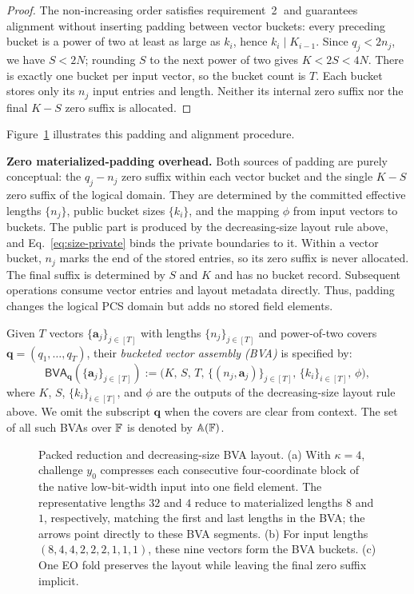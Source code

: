 \begin{proof}
The non-increasing order satisfies requirement~\textcircled{2} and guarantees
alignment without inserting padding between vector buckets: every preceding
bucket is a power of two at least as large as $k_i$, hence
$k_i\mid K_{i-1}$.  Since $q_j<2n_j$, we have $S<2N$;
rounding $S$ to the next power of two gives $K<2S<4N$.
There is exactly one bucket per input vector, so the bucket count is $T$.  Each bucket stores
only its $n_j$ input entries and length.  Neither its internal zero suffix nor
the final $K-S$ zero suffix is allocated.
\end{proof}
Figure~\ref{fig:layout} illustrates this padding and alignment procedure.

\mysmallskip
\noindent
\textbf{Zero materialized-padding overhead.}
Both sources of padding are purely conceptual: the $q_j-n_j$ zero suffix within
each vector bucket and the single $K-S$ zero suffix of the logical domain.
They are determined by the committed effective lengths $\{n_j\}$, public bucket
sizes $\{k_i\}$, and the mapping $\phi$ from input vectors to buckets.  The
public part is produced by the decreasing-size layout rule above, and
Eq.~\eqref{eq:size-private} binds the private boundaries to it.
Within a vector bucket, $n_j$ marks the end of the stored entries, so its zero
suffix is never allocated.  The final suffix is determined by $S$ and $K$ and
has no bucket record.  Subsequent operations consume vector entries and layout
metadata directly.  Thus, padding changes the logical PCS domain but adds no
stored field elements.

\begin{definition}
    Given $T$ vectors $\{\bm{a}_j\}_{j\in[T]}$ with lengths $\{n_j\}_{j\in[T]}$
and power-of-two covers $\bm q=(q_1,\ldots,q_T)$,
their \emph{bucketed vector assembly (BVA)} is specified by:
\[
    \mathsf{BVA}_{\bm q}(\{\bm{a}_j\}_{j\in[T]})
    :=
    \big(
        K,\,
        S,\,
        T,\,
        \{(n_j,\bm{a}_j)\}_{j\in[T]},\,
        \{k_i\}_{i\in[T]},\,
        \phi
    \big),
\]
where $K$, $S$, $\{k_i\}_{i\in[T]}$, and $\phi$ are the outputs of
the decreasing-size layout rule above.  We omit the subscript $\bm q$ when the covers are
clear from context.
The set of all such BVAs over ${\mathbb{F}}$ is denoted by ${\mathbb{A}({\mathbb{F}})}$.
\end{definition}

\begin{figure}[!t]
\noindent
\resizebox{\linewidth}{!}{

}
\caption{Packed reduction and decreasing-size BVA layout.  (a) With
$\kappa=4$, challenge $y_0$ compresses each consecutive four-coordinate block
of the native low-bit-width input into one field element.  The representative
lengths $32$ and $4$ reduce to materialized lengths $8$ and $1$, respectively,
matching the first and last
lengths in the BVA; the arrows point directly to these BVA segments.  (b) For input
lengths $(8,4,4,2,2,2,1,1,1)$, these nine vectors form the BVA buckets.  (c) One EO
fold preserves the layout while leaving the final zero suffix implicit.}
\label{fig:layout}
\end{figure}

